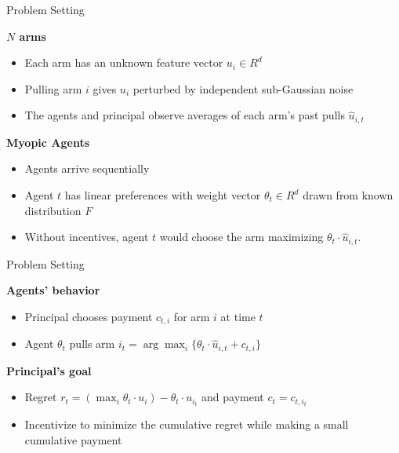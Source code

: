 \documentclass[serif]{beamer}
\begin{document}
\begin{frame}{Problem Setting}

\textbf{$N$ arms}
\begin{itemize}[label=\textbullet]
\item Each arm has an unknown feature vector $u_i\in R^{d}$
\item Pulling arm $i$ gives $u_i$ perturbed by independent sub-Gaussian noise
\item The agents and principal observe averages of each arm's past pulls $\hat{u}_{i,t}$
\end{itemize}
\vspace{1cm}
\textbf{Myopic Agents}
\begin{itemize}[label=\textbullet]
\item Agents arrive sequentially
\item Agent $t$ has linear preferences with weight vector $\theta_t\in R^{d}$ drawn from known distribution $F$
\item Without incentives, agent $t$ would choose the arm maximizing $\theta_{t}\cdot \hat{u}_{i,t}$.
\end{itemize}

\end{frame}

\begin{frame}{Problem Setting}

\textbf{Agents' behavior}
\begin{itemize}[label=\textbullet]
\item Principal chooses payment $c_{t,i}$ for arm $i$ at time $t$
\item Agent $\theta_t$ pulls arm $i_t = \arg\max_{i}\{\theta_{t}\cdot \hat{u}_{i,t}+c_{t,i}\}$
\end{itemize}
\vspace{1cm}
\textbf{Principal's goal}
\begin{itemize}[label=\textbullet]
\item Regret $r_t = (\max_{i} \theta_t \cdot u_i) - \theta_t \cdot u_{i_t}$ and payment $c_t = c_{t,i_t}$
\item Incentivize to minimize the cumulative regret while making a small cumulative payment
\end{itemize}

\end{frame}
\end{document}
